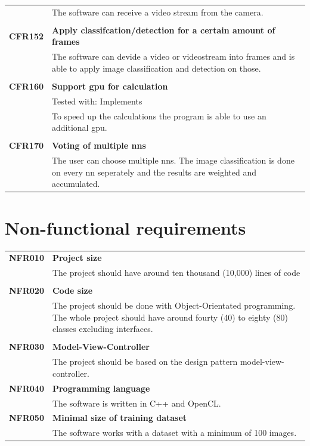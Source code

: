 \documentclass[parskip=full]{scrartcl}
\begin{document}
\begin{tabular}{p{2cm}p{12cm}}
& The software can receive a video stream from the camera.\\
& \\
\textbf{CFR152} & \textbf{Apply classifcation/detection for a certain amount of frames}\\
& The software can devide a video or videostream into frames and is able to apply \gls{image classification} and detection on those.\\
& \\
\textbf {CFR160} & \textbf{Support \gls{gpu} for calculation} \\
& Tested with: Implements\\
& To speed up the calculations the program is able to use an additional \gls{gpu}.\\
& \\
\textbf{CFR170} & \textbf{Voting of multiple \glspl{nn}}\\
& The user can choose multiple \glspl{nn}. The \gls{image classification} is done on every \gls{nn} seperately and the results are weighted and accumulated.\\
\end{tabular}

\section{Non-functional requirements}
\begin{tabular}{p{2cm}p{12cm}}
\textbf{NFR010} & \textbf{Project size}\\
& The project should have around ten thousand (10,000) lines of code \\
& \\
\textbf{NFR020} & \textbf{Code size}\\
& The project should be done with Object-Orientated programming. The whole project should have around fourty (40) to eighty (80) classes excluding interfaces. \\
& \\
\textbf{NFR030} & \textbf{Model-View-Controller}\\
& The project should be based on the design pattern model-view-controller. \\
\textbf{NFR040} & \textbf{Programming language}\\
& The software is written in C++ and OpenCL.\\
\textbf{NFR050} & \textbf{Minimal size of training dataset}\\
& The software works with a dataset with a minimum of 100 images.
\end{tabular}
\end{document}
